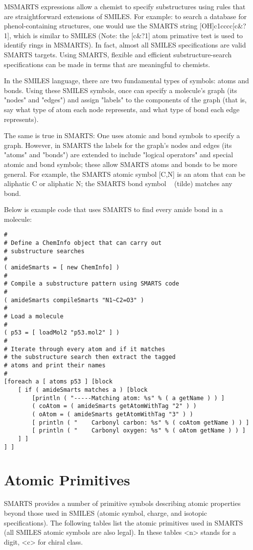\begin{itemize}
   MSMARTS expressions allow a chemist to specify substructures using rules that 
   are straightforward extensions of SMILES. For example: to search a database 
   for phenol-containing structures, one would use the SMARTS string 
   [OH]c1cccc[c\&?1], which is similar to SMILES (Note: the [c\&?1] atom 
   primative test is used to identify rings in MSMARTS). In fact, almost all 
   SMILES specifications are valid SMARTS targets. Using SMARTS, flexible 
   and efficient substructure-search specifications can be made in terms 
   that are meaningful to chemists.

   In the SMILES language, there are two fundamental types of symbols: atoms and bonds. Using these SMILES symbols, once can specify a molecule's graph (its "nodes" and "edges") and assign "labels" to the components of the graph (that is, say what type of atom each node represents, and what type of bond each edge represents).

   The same is true in SMARTS: One uses atomic and bond symbols to specify a graph. However, in SMARTS the labels for the graph's nodes and edges (its "atoms" and "bonds") are extended to include "logical operators" and special atomic and bond symbols; these allow SMARTS atoms and bonds to be more general. For example, the SMARTS atomic symbol [C,N] is an atom that can be aliphatic C or aliphatic N; the SMARTS bond symbol ~ (tilde) matches any bond.

Below is example code that uses SMARTS to find every amide bond in a molecule:
\begin{verbatim}
#
# Define a ChemInfo object that can carry out
# substructure searches
#
( amideSmarts = [ new ChemInfo] )
#
# Compile a substructure pattern using SMARTS code
#
( amideSmarts compileSmarts "N1~C2=O3" )
# 
# Load a molecule
#
( p53 = [ loadMol2 "p53.mol2" ] )
#
# Iterate through every atom and if it matches
# the substructure search then extract the tagged
# atoms and print their names
#
[foreach a [ atoms p53 ] [block
    [ if ( amideSmarts matches a ) [block 
        [println ( "-----Matching atom: %s" % ( a getName ) ) ]
        ( coAtom = ( amideSmarts getAtomWithTag "2" ) )
        ( oAtom = ( amideSmarts getAtomWithTag "3" ) )
        [ println ( "    Carbonyl carbon: %s" % ( coAtom getName ) ) ]
        [ println ( "    Carbonyl oxygen: %s" % ( oAtom getName ) ) ]
    ] ]
] ]
\end{verbatim}

\section{Atomic Primitives}
   SMARTS provides a number of primitive symbols describing atomic properties beyond those used in SMILES (atomic symbol, charge, and isotopic specifications). The following tables list the atomic primitives used in SMARTS (all SMILES atomic symbols are also legal). In these tables <n> stands for a digit, <c> for chiral class.


\end{itemize}
